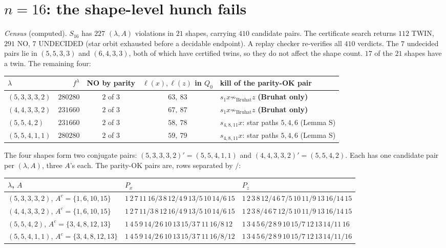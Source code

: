 \documentclass[11pt]{amsart}
\newcommand{\gr}[1]{\textsf{#1}}
\theoremstyle{definition}
\theoremstyle{remark}
\begin{document}
\section{\texorpdfstring{$n=16$}{n=16}: the shape-level hunch fails}

\emph{Census} (\gr{computed}). $S_{16}$ has $227$ $(\lambda,A)$ violations in $21$ shapes, carrying $410$ candidate pairs. The certificate search returns $112$ TWIN, $291$ NO, $7$ UNDECIDED (star orbit exhausted before a decidable endpoint). A replay checker re-verifies all $410$ verdicts. The $7$ undecided pairs lie in $(5,5,3,3)$ and $(6,4,3,3)$, both of which have certified twins, so they do not affect the shape count. $17$ of the $21$ shapes have a twin. The remaining four:

\begin{center}\small
\begin{tabular}{@{}lrccl@{}}\toprule
$\lambda$ & $f^\lambda$ & NO by parity & $\ell(x),\ell(z)$ in $Q_0$ & kill of the parity-OK pair\\\midrule
$(5,3,3,3,2)$ & $280280$ & $2$ of $3$ & $63,\ 83$ & $s_1x\not\sim_{\mathrm{Bruhat}}z$ \textbf{(Bruhat only)}\\
$(4,4,3,3,2)$ & $231660$ & $2$ of $3$ & $67,\ 87$ & $s_1x\not\sim_{\mathrm{Bruhat}}z$ \textbf{(Bruhat only)}\\
$(5,5,4,2)$ & $231660$ & $2$ of $3$ & $58,\ 78$ & $s_{4,8,11}x$: star paths $5,4,6$ (Lemma S)\\
$(5,5,4,1,1)$ & $280280$ & $2$ of $3$ & $59,\ 79$ & $s_{4,8,11}x$: star paths $5,4,6$ (Lemma S)\\\bottomrule
\end{tabular}
\end{center}

The four shapes form two conjugate pairs: $(5,3,3,3,2)'=(5,5,4,1,1)$ and $(4,4,3,3,2)'=(5,5,4,2)$. Each has one candidate pair per $(\lambda,A)$, three $A$'s each. The parity-OK pairs are, rows separated by $/$:
\begin{center}\footnotesize
\begin{tabular}{@{}lll@{}}\toprule
$\lambda$, $A$ & $P_x$ & $P_z$\\\midrule
$(5,3,3,3,2)$, $A^c=\{1,6,10,15\}$ & $1\,2\,7\,11\,16/3\,8\,12/4\,9\,13/5\,10\,14/6\,15$ & $1\,2\,3\,8\,12/4\,6\,7/5\,10\,11/9\,13\,16/14\,15$\\
$(4,4,3,3,2)$, $A^c=\{1,6,10,15\}$ & $1\,2\,7\,11/3\,8\,12\,16/4\,9\,13/5\,10\,14/6\,15$ & $1\,2\,3\,8/4\,6\,7\,12/5\,10\,11/9\,13\,16/14\,15$\\
$(5,5,4,2)$, $A^c=\{3,4,8,12,13\}$ & $1\,4\,5\,9\,14/2\,6\,10\,13\,15/3\,7\,11\,16/8\,12$ & $1\,3\,4\,5\,6/2\,8\,9\,10\,15/7\,12\,13\,14/11\,16$\\
$(5,5,4,1,1)$, $A^c=\{3,4,8,12,13\}$ & $1\,4\,5\,9\,14/2\,6\,10\,13\,15/3\,7\,11\,16/8/12$ & $1\,3\,4\,5\,6/2\,8\,9\,10\,15/7\,12\,13\,14/11/16$\\\bottomrule
\end{tabular}
\end{center}
\end{document}
